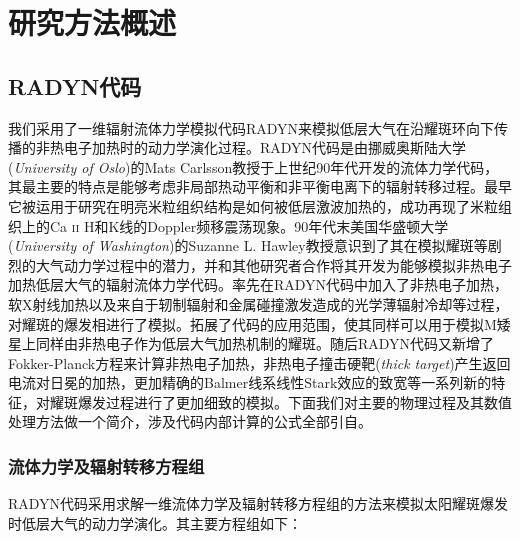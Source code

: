 
\chapter{研究方法概述}\label{chap:2}
\section{RADYN代码}
我们采用了一维辐射流体力学模拟代码RADYN\parencite{Carlsson1992,Carlsson1997,Allred2005,Allred2015}来模拟低层大气在沿耀斑环向下传播的非热电子加热时的动力学演化过程。RADYN代码是由挪威奥斯陆大学(\textit{University of Oslo})的Mats Carlsson教授于上世纪90年代开发的流体力学代码，其最主要的特点是能够考虑非局部热动平衡和非平衡电离下的辐射转移过程。最早它被运用于研究在明亮米粒组织结构是如何被低层激波加热的，成功再现了米粒组织上的Ca \textsc{ii} H和K线的Doppler频移震荡现象\parencites{Carlsson1997}。90年代末美国华盛顿大学(\textit{University of Washington})的Suzanne L. Hawley教授意识到了其在模拟耀斑等剧烈的大气动力学过程中的潜力，并和其他研究者合作将其开发为能够模拟非热电子加热低层大气的辐射流体力学代码。\textcites{Abbett1999}率先在RADYN代码中加入了非热电子加热，软X射线加热以及来自于轫制辐射和金属碰撞激发造成的光学薄辐射冷却等过程，对耀斑的爆发相进行了模拟。\textcites{Allred2005}拓展了代码的应用范围，使其同样可以用于模拟M矮星上同样由非热电子作为低层大气加热机制的耀斑。随后RADYN代码又新增了Fokker-Planck方程来计算非热电子加热，非热电子撞击硬靶(\textit{thick target})产生返回电流对日冕的加热\parencites{Allred2015}，更加精确的Balmer线系线性Stark效应的致宽\parencites{Kowalski2017b}等一系列新的特征，对耀斑爆发过程进行了更加细致的模拟。下面我们对主要的物理过程及其数值处理方法做一个简介，涉及代码内部计算的公式全部引自\textcites{Allred2015}。

\subsection{流体力学及辐射转移方程组}
RADYN代码采用求解一维流体力学及辐射转移方程组的方法来模拟太阳耀斑爆发时低层大气的动力学演化。其主要方程组如下\parencites{Allred2015}：

